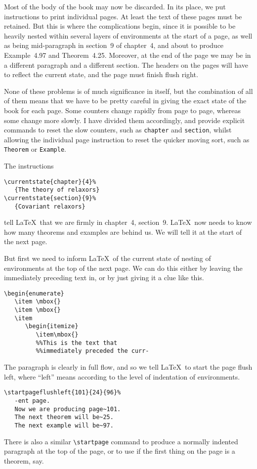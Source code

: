 Most of the body of the book may now be discarded.
In its place, we put instructions to print individual pages.
At least the text of these pages must be retained.
But this is where the complications begin, since it is possible to be heavily
nested within several layers of environments at the start of a page, as well
as being mid-paragraph in section~9 of chapter~4, and about to produce
Example~4.97 and Theorem~4.25. Moreover, at the end of the page we may be in
a different paragraph and a different section. The headers on the pages will
have to reflect the current state, and the page must finish flush right.

None of these problems is of much significance in itself, but the
combination of all of them means that we have to be pretty careful in giving
the exact state of the book for each page. Some counters change rapidly from
page to page, whereas some change more slowly. I have divided them
accordingly, and provide explicit commands to reset the slow counters, such
as \verb"chapter" and \verb"section", whilst allowing the individual page
instruction to reset the quicker moving sort, such as \verb"Theorem" or
\verb"Example".

The instructions
\begin{verbatim}
\currentstate{chapter}{4}%
   {The theory of relaxors}
\currentstate{section}{9}%
   {Covariant relaxors}
\end{verbatim}
tell \LaTeX\ that we are firmly in chapter~4, section~9. \LaTeX\ now needs to
know how many theorems and examples are behind us. We will tell it at the start
of the next page.

But first we need to inform \LaTeX\ of the current state
of nesting of environments
at the top of the next page.
We can do this either by leaving the immediately
preceding text in, or by just giving it a clue like this.
\begin{verbatim}
\begin{enumerate}
   \item \mbox{}
   \item \mbox{}
   \item
      \begin{itemize}
         \item\mbox{}
         %%This is the text that
         %%immediately preceded the curr-
\end{verbatim}
The paragraph is clearly in full flow, and so we tell \LaTeX\ to start the page
flush left, where ``left'' means according to the level of indentation of
environments.
\begin{verbatim}
\startpageflushleft{101}{24}{96}%
   -ent page.
   Now we are producing page~101.
   The next theorem will be~25.
   The next example will be~97.
\end{verbatim}
There is also a similar \verb"\startpage" command to produce a normally
indented paragraph at the top of the page, or to use if the first thing
on the page is a theorem, say.

